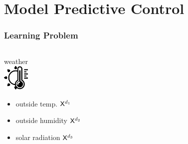 
\section{Model Predictive Control}

\begin{frame}[t]
	\frametitle{Learning Problem}
	
	\vspace{-0.75cm}
	
	\begin{columns}[t]
		
		\begin{column}{0.33\textwidth}
			\begin{center}
				\Large
				\textcolor{mycolor}{weather} \\
				\small
				\vspace{0.4cm}
				\includegraphics[width=3pc]{figures/temperature.eps}\\
				\begin{itemize}
					\item \color{red} outside temp. $\mathsf{X}^{d_1}$
					\item outside humidity $\mathsf{X}^{d_2}$
					\item solar radiation $\mathsf{X}^{d_3}$
				\end{itemize}
			\end{center}
		\end{column}
		

\end{columns}
\end{frame}
